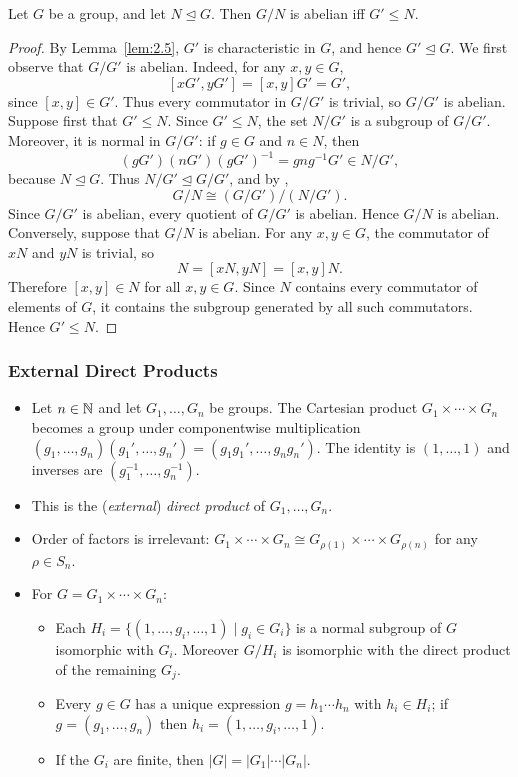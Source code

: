 \documentclass[../Odyssey_Project.tex]{subfiles}
\begin{document}
\begin{proposition}
\label{prop:2.6}
Let $G$ be a group, and let $N \trianglelefteq G$. Then $G/N$ is abelian iff $G' \leq N$.
\end{proposition}
\begin{proof}
    By Lemma~\ref{lem:2.5}, $G'$ is characteristic in $G$, and hence $G' \trianglelefteq G$. We first observe that $G/G'$ is abelian. Indeed, for any $x,y \in G$,
    \[
        [xG',yG'] = [x,y]G' = G',
    \]
    since $[x,y] \in G'$. Thus every commutator in $G/G'$ is trivial, so $G/G'$ is abelian. \\
    Suppose first that $G' \leq N$. Since $G' \leq N$, the set $N/G'$ is a subgroup of $G/G'$. Moreover, it is normal in $G/G'$: if $g \in G$ and $n \in N$, then
    \[
        (gG')(nG')(gG')^{-1} = gng^{-1}G' \in N/G',
    \]
    because $N \trianglelefteq G$. Thus $N/G' \trianglelefteq G/G'$, and by ,
    \[
        G/N \cong (G/G')/(N/G').
    \]
    Since $G/G'$ is abelian, every quotient of $G/G'$ is abelian. Hence $G/N$ is abelian. \\
    Conversely, suppose that $G/N$ is abelian. For any $x,y \in G$, the commutator of $xN$ and $yN$ is trivial, so
    \[
        N = [xN,yN] = [x,y]N.
    \]
    Therefore $[x,y] \in N$ for all $x,y \in G$. Since $N$ contains every commutator of elements of $G$, it contains the subgroup generated by all such commutators. Hence $G' \leq N$.
\end{proof}

\subsubsection*{External Direct Products}
\begin{itemize}
    \item Let $n \in \mathbb{N}$ and let $G_1, \dots, G_n$ be groups. The Cartesian product $G_1 \times \cdots \times G_n$ becomes a group under componentwise multiplication $(g_1,\dots,g_n)(g_1',\dots,g_n') = (g_1 g_1', \dots, g_n g_n')$. The identity is $(1,\dots,1)$ and inverses are $(g_1^{-1},\dots,g_n^{-1})$.
    \item This is the (\emph{external}) \emph{direct product} of $G_1,\dots,G_n$.
    \item Order of factors is irrelevant: $G_1 \times \cdots \times G_n \cong G_{\rho(1)} \times \cdots \times G_{\rho(n)}$ for any $\rho \in S_n$.
    \item For $G = G_1 \times \cdots \times G_n$:
    \begin{itemize}
        \item Each $H_i = \{(1,\dots,g_i,\dots,1) \mid g_i \in G_i\}$ is a normal subgroup of $G$ isomorphic with $G_i$. Moreover $G/H_i$ is isomorphic with the direct product of the remaining $G_j$.
        \item Every $g \in G$ has a unique expression $g = h_1 \cdots h_n$ with $h_i \in H_i$; if $g = (g_1,\dots,g_n)$ then $h_i = (1,\dots,g_i,\dots,1)$.
        \item If the $G_i$ are finite, then $|G| = |G_1| \cdots |G_n|$.
    \end{itemize}
\end{itemize}
\end{document}
